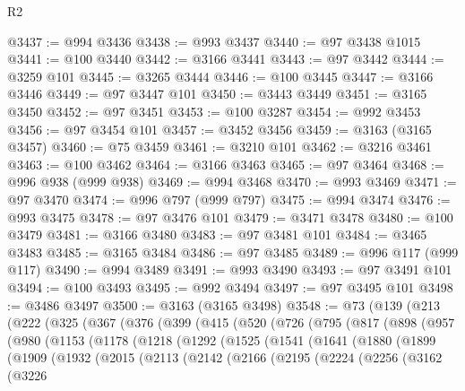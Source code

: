 \begin{lexlean}{R2}
\begin{coremodule}
@3437 := @994 @3436
@3438 := @993 @3437
@3440 := @97 @3438 @1015
@3441 := @100 @3440
@3442 := @3166 @3441
@3443 := @97 @3442
@3444 := @3259 @101
@3445 := @3265 @3444
@3446 := @100 @3445
@3447 := @3166 @3446
@3449 := @97 @3447 @101
@3450 := @3443 @3449
@3451 := @3165 @3450
@3452 := @97 @3451
@3453 := @100 @3287
@3454 := @992 @3453
@3456 := @97 @3454 @101
@3457 := @3452 @3456
@3459 := @3163 (@3165 @3457)
@3460 := @75 @3459
@3461 := @3210 @101
@3462 := @3216 @3461
@3463 := @100 @3462
@3464 := @3166 @3463
@3465 := @97 @3464
@3468 := @996 @938 (@999 @938)
@3469 := @994 @3468
@3470 := @993 @3469
@3471 := @97 @3470
@3474 := @996 @797 (@999 @797)
@3475 := @994 @3474
@3476 := @993 @3475
@3478 := @97 @3476 @101
@3479 := @3471 @3478
@3480 := @100 @3479
@3481 := @3166 @3480
@3483 := @97 @3481 @101
@3484 := @3465 @3483
@3485 := @3165 @3484
@3486 := @97 @3485
@3489 := @996 @117 (@999 @117)
@3490 := @994 @3489
@3491 := @993 @3490
@3493 := @97 @3491 @101
@3494 := @100 @3493
@3495 := @992 @3494
@3497 := @97 @3495 @101
@3498 := @3486 @3497
@3500 := @3163 (@3165 @3498)
@3548 := @73
    (@139
      (@213
        (@222
          (@325
            (@367
              (@376
                (@399
                  (@415
                    (@520
                      (@726
                        (@795
                          (@817
                            (@898
                              (@957
                                (@980
                                  (@1153
                                    (@1178
                                      (@1218
                                        (@1292
                                          (@1525
                                            (@1541
                                              (@1641
                                                (@1880
                                                  (@1899
                                                    (@1909
                                                      (@1932
                                                        (@2015
                                                          (@2113
                                                            (@2142
                                                              (@2166
                                                                (@2195
                                                                  (@2224
                                                                    (@2256
                                                                      (@3162
                                                                        (@3226

\end{coremodule}
\end{lexlean}
